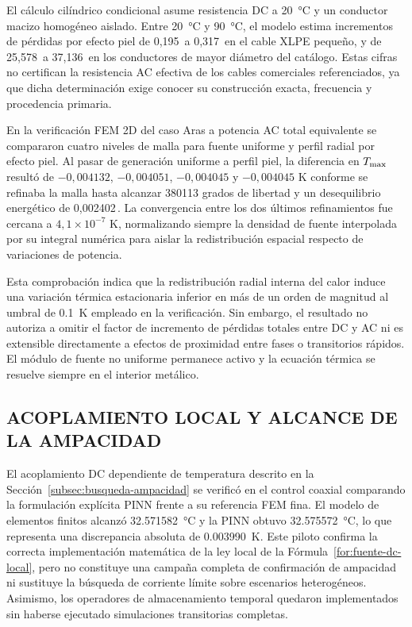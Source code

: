 El cálculo cilíndrico condicional asume resistencia DC a \SI{20}{\celsius} y un conductor macizo homogéneo aislado. Entre \SI{20}{\celsius} y \SI{90}{\celsius}, el modelo estima incrementos de pérdidas por efecto piel de 0,195\,\pct{} a 0,317\,\pct{} en el cable XLPE pequeño, y de 25,578\,\pct{} a 37,136\,\pct{} en los conductores de mayor diámetro del catálogo. Estas cifras no certifican la resistencia AC efectiva de los cables comerciales referenciados, ya que dicha determinación exige conocer su construcción exacta, frecuencia y procedencia primaria.

En la verificación FEM 2D del caso Aras a potencia AC total equivalente se compararon cuatro niveles de malla para fuente uniforme y perfil radial por efecto piel. Al pasar de generación uniforme a perfil piel, la diferencia en $T_{\max}$ resultó de $-0,004132$, $-0,004051$, $-0,004045$ y $-0,004045$ K conforme se refinaba la malla hasta alcanzar \num{380113} grados de libertad y un desequilibrio energético de 0,002402\,\pct{}. La convergencia entre los dos últimos refinamientos fue cercana a $4,1\times10^{-7}$ K, normalizando siempre la densidad de fuente interpolada por su integral numérica para aislar la redistribución espacial respecto de variaciones de potencia.

Esta comprobación indica que la redistribución radial interna del calor induce una variación térmica estacionaria inferior en más de un orden de magnitud al umbral de \SI{0,1}{\kelvin} empleado en la verificación. Sin embargo, el resultado no autoriza a omitir el factor de incremento de pérdidas totales entre DC y AC ni es extensible directamente a efectos de proximidad entre fases o transitorios rápidos. El módulo de fuente no uniforme permanece activo y la ecuación térmica se resuelve siempre en el interior metálico.

\subsection{ACOPLAMIENTO LOCAL Y ALCANCE DE LA AMPACIDAD}

El acoplamiento DC dependiente de temperatura descrito en la Sección~\ref{subsec:busqueda-ampacidad} se verificó en el control coaxial comparando la formulación explícita PINN frente a su referencia FEM fina. El modelo de elementos finitos alcanzó \SI{32,571582}{\celsius} y la PINN obtuvo \SI{32,575572}{\celsius}, lo que representa una discrepancia absoluta de \SI{0,003990}{\kelvin}. Este piloto confirma la correcta implementación matemática de la ley local de la Fórmula~\ref{for:fuente-dc-local}, pero no constituye una campaña completa de confirmación de ampacidad ni sustituye la búsqueda de corriente límite sobre escenarios heterogéneos. Asimismo, los operadores de almacenamiento temporal quedaron implementados sin haberse ejecutado simulaciones transitorias completas.

